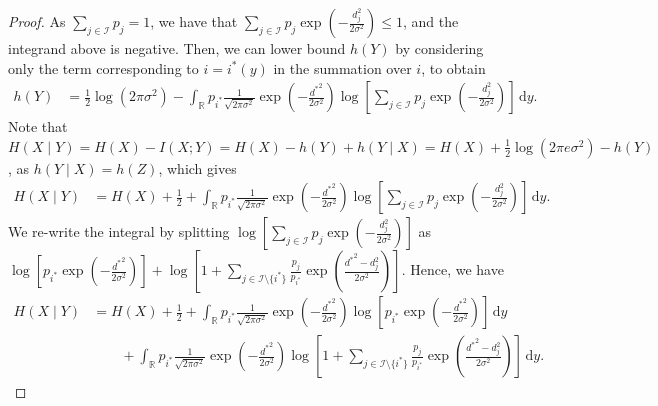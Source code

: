 \documentclass[11pt]{article}
\newcommand{\calI}{\mathcal{I}}
\newcommand{\bbR}{\mathbb{R}}
\newcommand{\intR}{\int_{\bbR}}
\renewcommand{\d}{\,\mathrm{d}}
\begin{document}
\begin{proof}[Proof]
		As $\sum_{j \in \calI} p_j = 1$, we have that $\sum_{j \in \calI} p_j \exp\left(-\tfrac{d_j^2}{2\sigma^2}\right)  \leq 1$, and the integrand above is negative.
		Then, we can lower bound $h(Y)$ by considering only the term corresponding to $i = i^*(y)$ in the summation over $i$, to obtain
		\begin{align*}
			h(Y) &= \frac12\log(2\pi\sigma^2) - \intR p_{i^*} \tfrac{1}{\sqrt{2\pi \sigma^2}}\exp\left(-\tfrac{{d^*}^2}{2\sigma^2}\right) \log \left[\sum_{j \in \calI} p_j \exp\left(-\tfrac{d_j^2}{2\sigma^2}\right) \right]\d y.
		\end{align*}
		Note that $H(X \mid Y) = H(X) - I(X;Y) = H(X) - h(Y) + h(Y \mid X) = H(X) + \frac{1}{2}\log(2\pi e \sigma^2) - h(Y)$, as $h(Y \mid  X) = h(Z)$, which gives
		\begin{align}
			H(X \mid Y) &= H(X) + \frac12 + \intR p_{i^*} \tfrac{1}{\sqrt{2\pi \sigma^2}}\exp\left(-\tfrac{{d^*}^2}{2\sigma^2}\right) \log \left[\sum_{j \in \calI} p_j \exp\left(-\tfrac{d_j^2}{2\sigma^2}\right) \right]\d y . \label{eqn: h_x_y}
		\end{align}
		We re-write the integral by splitting $\log \left[\sum_{j \in \calI} p_j \exp\left(-\tfrac{d_j^2}{2\sigma^2}\right)\right]$ as $\log \left[p_{i^*} \exp\left(-\tfrac{{d^*}^2}{2\sigma^2}\right)\right] + \log \left[1 + \sum_{j\in \calI \setminus \{i^*\}} \frac{p_j}{p_{i^*}} \exp\left(\tfrac{{d^*}^2-d_j^2}{2\sigma^2}\right)\right]$. Hence, we have
		\begin{align}
			H(X \mid Y) &= H(X) + \frac12 + \intR p_{i^*} \tfrac{1}{\sqrt{2\pi \sigma^2}}\exp\left(-\tfrac{{d^*}^2}{2\sigma^2}\right) \log \left[p_{i^*} \exp\left(-\tfrac{{d^*}^2}{2\sigma^2}\right)\right]\d y  \nonumber \\
			&\qquad + \intR p_{i^*} \tfrac{1}{\sqrt{2\pi \sigma^2}}\exp\left(-\tfrac{{d^*}^2}{2\sigma^2}\right) \log \left[1 + \sum_{j\in \calI \setminus \{i^*\}} \frac{p_j}{p_{i^*}} \exp\left(\tfrac{{d^*}^2-d_j^2}{2\sigma^2}\right)\right] \d y. \label{eqn: h_x_y_ub}
		\end{align}
		

\end{proof}
\end{document}
